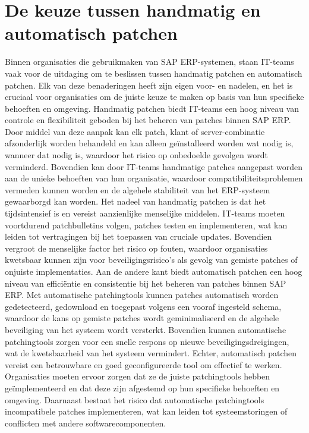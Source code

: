 \section{De keuze tussen handmatig en automatisch patchen}
Binnen organisaties die gebruikmaken van SAP ERP-systemen, staan IT-teams vaak voor de uitdaging om te beslissen tussen handmatig patchen en automatisch patchen. Elk van deze benaderingen heeft zijn eigen voor- en nadelen, en het is cruciaal voor organisaties om de juiste keuze te maken op basis van hun specifieke behoeften en omgeving.
Handmatig patchen biedt IT-teams een hoog niveau van controle en flexibiliteit geboden bij het beheren van patches binnen SAP ERP. Door middel van deze aanpak kan elk patch, klant of server-combinatie afzonderlijk worden behandeld en kan alleen geïnstalleerd worden wat nodig is, wanneer dat nodig is, waardoor het risico op onbedoelde gevolgen wordt verminderd. Bovendien kan door IT-teams handmatige patches aangepast worden aan de unieke behoeften van hun organisatie, waardoor compatibiliteitsproblemen vermeden kunnen worden en de algehele stabiliteit van het ERP-systeem gewaarborgd kan worden. \autocite{Hooper2018}
Het nadeel van handmatig patchen is dat het tijdsintensief is en vereist aanzienlijke menselijke middelen. IT-teams moeten voortdurend patchbulletins volgen, patches testen en implementeren, wat kan leiden tot vertragingen bij het toepassen van cruciale updates. Bovendien vergroot de menselijke factor het risico op fouten, waardoor organisaties kwetsbaar kunnen zijn voor beveiligingsrisico's als gevolg van gemiste patches of onjuiste implementaties.
Aan de andere kant biedt automatisch patchen een hoog niveau van efficiëntie en consistentie bij het beheren van patches binnen SAP ERP. Met automatische patchingtools kunnen patches automatisch worden gedetecteerd, gedownload en toegepast volgens een vooraf ingesteld schema, waardoor de kans op gemiste patches wordt geminimaliseerd en de algehele beveiliging van het systeem wordt versterkt. Bovendien kunnen automatische patchingtools zorgen voor een snelle respons op nieuwe beveiligingsdreigingen, wat de kwetsbaarheid van het systeem vermindert.
Echter, automatisch patchen vereist een betrouwbare en goed geconfigureerde tool om effectief te werken. Organisaties moeten ervoor zorgen dat ze de juiste patchingtools hebben geïmplementeerd en dat deze zijn afgestemd op hun specifieke behoeften en omgeving. Daarnaast bestaat het risico dat automatische patchingtools incompatibele patches implementeren, wat kan leiden tot systeemstoringen of conflicten met andere softwarecomponenten.

